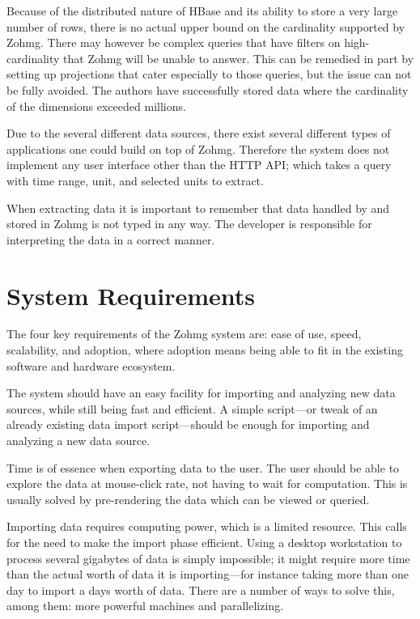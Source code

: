 Because of the distributed nature of HBase and its ability to store a very large
number of rows, there is no actual upper bound on the cardinality supported by
Zohmg. There may however be complex queries that have filters on
high-cardinality that Zohmg will be unable to answer. This can be remedied in
part by setting up projections that cater especially to those queries, but the
issue can not be fully avoided. The authors have successfully stored data where
the cardinality of the dimensions exceeded millions.

Due to the several different data sources, there exist several different types
of applications one could build on top of Zohmg. Therefore the system does not
implement any user interface other than the HTTP API; which takes a query with
time range, unit, and selected units to extract.

When extracting data it is important to remember that data handled by and stored
in Zohmg is not typed in any way. The developer is responsible for interpreting
the data in a correct manner.



\section{System Requirements}


The four key requirements of the Zohmg system are: ease of use, speed,
scalability, and adoption, where adoption means being able to fit in the
existing software and hardware ecosystem.

The system should have an easy facility for importing and analyzing new data
sources, while still being fast and efficient. A simple script---or tweak of an
already existing data import script---should be enough for importing and
analyzing a new data source.

Time is of essence when exporting data to the user. The user should be able to
explore the data at mouse-click rate, not having to wait for computation. This
is usually solved by pre-rendering the data which can be viewed or queried.

Importing data requires computing power, which is a limited resource. This calls
for the need to make the import phase efficient. Using a desktop workstation to
process several gigabytes of data is simply impossible; it might require more
time than the actual worth of data it is importing---for instance taking more
than one day to import a days worth of data. There are a number of ways to solve
this, among them: more powerful machines and parallelizing.

